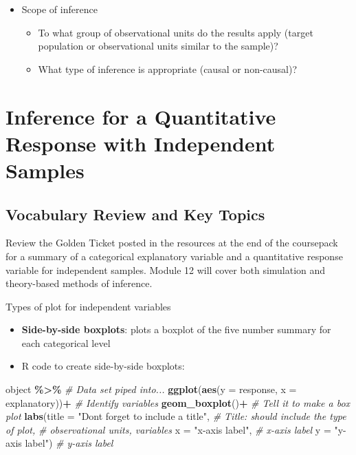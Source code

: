 \documentclass[
]{report}
\newenvironment{Shaded}{\begin{snugshade}}{\end{snugshade}}
\newcommand{\AttributeTok}[1]{\textcolor[rgb]{0.13,0.29,0.53}{#1}}
\newcommand{\CommentTok}[1]{\textcolor[rgb]{0.56,0.35,0.01}{\textit{#1}}}
\newcommand{\FunctionTok}[1]{\textcolor[rgb]{0.13,0.29,0.53}{\textbf{#1}}}
\newcommand{\NormalTok}[1]{#1}
\newcommand{\SpecialCharTok}[1]{\textcolor[rgb]{0.81,0.36,0.00}{\textbf{#1}}}
\newcommand{\StringTok}[1]{\textcolor[rgb]{0.31,0.60,0.02}{#1}}
\begin{document}
\newpage

\begin{itemize}
\item
  Scope of inference

  \begin{itemize}
  \item
    To what group of observational units do the results apply (target population or observational units similar to the sample)?
  \item
    What type of inference is appropriate (causal or non-causal)?
  \end{itemize}
\end{itemize}

\newpage

\chapter{Inference for a Quantitative Response with Independent Samples}\label{inference-for-a-quantitative-response-with-independent-samples}

\section{Vocabulary Review and Key Topics}\label{vocabulary-review-and-key-topics-1}

Review the Golden Ticket posted in the resources at the end of the coursepack for a summary of a categorical explanatory variable and a quantitative response variable for independent samples. Module 12 will cover both simulation and theory-based methods of inference.

Types of plot for independent variables

\begin{itemize}
\item
  \textbf{Side-by-side boxplots}: plots a boxplot of the five number summary for each categorical level
\item
  R code to create side-by-side boxplots:
\end{itemize}

\begin{Shaded}
\begin{Highlighting}[]
\NormalTok{object }\SpecialCharTok{\%\textgreater{}\%}  \CommentTok{\# Data set piped into...}
  \FunctionTok{ggplot}\NormalTok{(}\FunctionTok{aes}\NormalTok{(}\AttributeTok{y =}\NormalTok{ response, }\AttributeTok{x =}\NormalTok{ explanatory))}\SpecialCharTok{+}  \CommentTok{\# Identify variables}
  \FunctionTok{geom\_boxplot}\NormalTok{()}\SpecialCharTok{+}  \CommentTok{\# Tell it to make a box plot}
  \FunctionTok{labs}\NormalTok{(}\AttributeTok{title =} \StringTok{"Don\textquotesingle{}t forget to include a title"}\NormalTok{,  }\CommentTok{\# Title: should include the type of plot,}
       \CommentTok{\# observational units, variables}
       \AttributeTok{x =} \StringTok{"x{-}axis label"}\NormalTok{,    }\CommentTok{\# x{-}axis label}
       \AttributeTok{y =} \StringTok{"y{-}axis label"}\NormalTok{)  }\CommentTok{\# y{-}axis label}
\end{Highlighting}
\end{Shaded}
\end{document}
